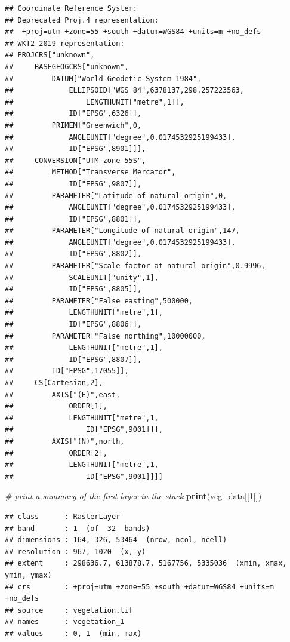 \documentclass[12pt,]{book}
\newenvironment{Shaded}{\begin{snugshade}}{\end{snugshade}}
\newcommand{\CommentTok}[1]{\textcolor[rgb]{0.56,0.35,0.01}{\textit{#1}}}
\newcommand{\DecValTok}[1]{\textcolor[rgb]{0.00,0.00,0.81}{#1}}
\newcommand{\KeywordTok}[1]{\textcolor[rgb]{0.13,0.29,0.53}{\textbf{#1}}}
\newcommand{\NormalTok}[1]{#1}
\begin{document}
\begin{verbatim}
## Coordinate Reference System:
## Deprecated Proj.4 representation:
##  +proj=utm +zone=55 +south +datum=WGS84 +units=m +no_defs 
## WKT2 2019 representation:
## PROJCRS["unknown",
##     BASEGEOGCRS["unknown",
##         DATUM["World Geodetic System 1984",
##             ELLIPSOID["WGS 84",6378137,298.257223563,
##                 LENGTHUNIT["metre",1]],
##             ID["EPSG",6326]],
##         PRIMEM["Greenwich",0,
##             ANGLEUNIT["degree",0.0174532925199433],
##             ID["EPSG",8901]]],
##     CONVERSION["UTM zone 55S",
##         METHOD["Transverse Mercator",
##             ID["EPSG",9807]],
##         PARAMETER["Latitude of natural origin",0,
##             ANGLEUNIT["degree",0.0174532925199433],
##             ID["EPSG",8801]],
##         PARAMETER["Longitude of natural origin",147,
##             ANGLEUNIT["degree",0.0174532925199433],
##             ID["EPSG",8802]],
##         PARAMETER["Scale factor at natural origin",0.9996,
##             SCALEUNIT["unity",1],
##             ID["EPSG",8805]],
##         PARAMETER["False easting",500000,
##             LENGTHUNIT["metre",1],
##             ID["EPSG",8806]],
##         PARAMETER["False northing",10000000,
##             LENGTHUNIT["metre",1],
##             ID["EPSG",8807]],
##         ID["EPSG",17055]],
##     CS[Cartesian,2],
##         AXIS["(E)",east,
##             ORDER[1],
##             LENGTHUNIT["metre",1,
##                 ID["EPSG",9001]]],
##         AXIS["(N)",north,
##             ORDER[2],
##             LENGTHUNIT["metre",1,
##                 ID["EPSG",9001]]]]
\end{verbatim}

\begin{Shaded}
\begin{Highlighting}[]
\CommentTok{# print a summary of the first layer in the stack}
\KeywordTok{print}\NormalTok{(veg_data[[}\DecValTok{1}\NormalTok{]])}
\end{Highlighting}
\end{Shaded}

\begin{verbatim}
## class      : RasterLayer 
## band       : 1  (of  32  bands)
## dimensions : 164, 326, 53464  (nrow, ncol, ncell)
## resolution : 967, 1020  (x, y)
## extent     : 298636.7, 613878.7, 5167756, 5335036  (xmin, xmax, ymin, ymax)
## crs        : +proj=utm +zone=55 +south +datum=WGS84 +units=m +no_defs 
## source     : vegetation.tif 
## names      : vegetation_1 
## values     : 0, 1  (min, max)
\end{verbatim}
\end{document}
